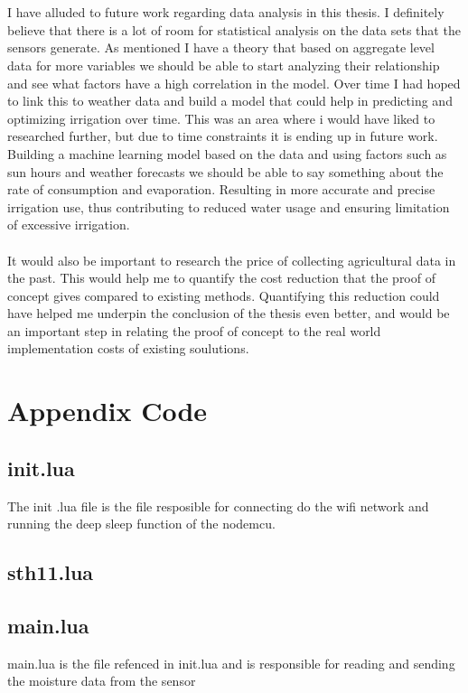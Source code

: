 \documentclass[]{uiophd}
\begin{document}
\\\\
I have alluded to future work regarding data analysis in this thesis. I definitely believe that there is a lot of room for statistical analysis on the data sets that the sensors generate. As mentioned I have a theory that based on aggregate level data for more variables we should be able to start analyzing their relationship and see what factors have a high correlation in the model. Over time I had hoped to link this to weather data and build a model that could help in predicting and optimizing irrigation over time. This was an area where i would have liked to researched further, but due to time constraints it is ending up in future work. Building a machine learning model based on the data and using factors such as sun hours and weather forecasts we should be able to say something about the rate of consumption and evaporation. Resulting in more accurate and precise irrigation use, thus contributing to reduced water usage and ensuring limitation of excessive irrigation.
\\\\
It would also be important to research the price of collecting agricultural data in the past. This would help me to quantify the cost reduction that the proof of concept gives compared to existing methods. Quantifying this reduction could have helped me underpin the conclusion of the thesis even better, and would be an important step in relating the proof of concept to the real world implementation costs of existing soulutions.

\printbibliography

\chapter{Appendix Code}
\linespread{1}

\section{init.lua}
The init .lua file is the file resposible for connecting do the wifi network and running the deep sleep function of the nodemcu.


\section{sth11.lua}


\section{main.lua}
main.lua is the file refenced in init.lua and is responsible for reading and sending the moisture data from the sensor

\end{document}

